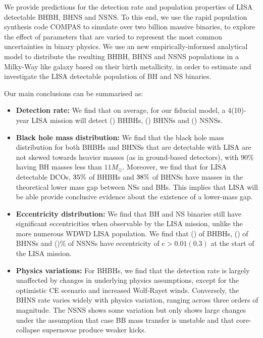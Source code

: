 We provide predictions for the detection rate and population properties of LISA detectable BHBH, BHNS and NSNS.
To this end, we use the rapid population synthesis code COMPAS to simulate over two billion massive binaries, to explore the effect of parameters that are varied to represent the most common uncertainties in binary physics. We use an new empirically-informed analytical model to distribute the resulting BHBH, BHNS and NSNS populations in a Milky-Way like galaxy based on their birth metallicity, in order to estimate and investigate the LISA detectable population of BH and NS binaries.

Our main conclusions can be summarised as:
\begin{itemize}
    \item \textbf{Detection rate:} We find that on average, for our fiducial model, a 4(10)-year LISA mission will detect \BHBHFourYear{}(\BHBHTenYear{}) BHBHs, \BHNSFourYear{}(\BHNSTenYear{}) BHNSs and \NSNSFourYear{}(\NSNSTenYear{}) NSNSs.
    \item \textbf{Black hole mass distribution:} We find that the black hole mass distribution for both BHBHs and BHNSs that are detectable with LISA are not skewed towards heavier masses (as in ground-based detectors), with 90\% having BH masses less than $11 \unit{M_\odot}$. Moreover, we find that for LISA detectable DCOs, $35\%{}$ of BHBHs and $38\%{}$ of BHNSs have masses in the theoretical lower mass gap between NSs and BHs. This implies that LISA will be able provide conclusive evidence about the existence of a lower-mass gap. 
    \item \textbf{Eccentricity distribution:} We find that BH and NS binaries still have significant eccentricities when observable by the LISA mission, unlike the more numerous WDWD LISA population. We find that \BHBHNotCirc{}(\BHBHHighlyEccentric{}) of BHBHs, \BHNSNotCirc{}(\BHNSHighlyEccentric{}) of BHNSs and \NSNSNotCirc{}(\NSNSHighlyEccentric{})\% of NSNSs have eccentricity of $e > 0.01(0.3)$ at the start of the LISA mission.
    \item \textbf{Physics variations:} For BHBHs, we find that the detection rate is largely unaffected by changes in underlying physics assumptions, except for the optimistic CE scenario and increased Wolf-Rayet winds. Conversely, the BHNS rate varies widely with physics variation, ranging across three orders of magnitude. The NSNS shows some variation but only shows large changes under the assumption that case BB mass transfer is unstable and that core-collapse supernovae produce weaker kicks.

\end{itemize}
